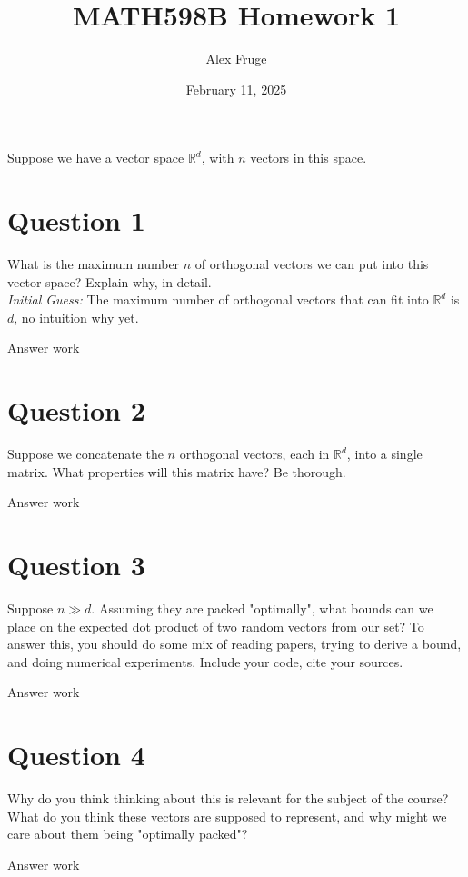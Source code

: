 \documentclass[hidelinks]{article}
\title{\textbf{MATH598B Homework 1}}
\author{Alex Fruge}
\date{February 11, 2025}
\begin{document}
	\hypersetup{bookmarksnumbered=true,}
	\pagecolor{black}
	\color{white}
	\maketitle

	
	\begin{Large}
			Suppose we have a vector space $\mathbb{R}^d$, with $n$ vectors in this space. 
	\end{Large}
	
	\section{Question 1}

	What is the maximum number $n$ of orthogonal vectors we can put into this vector space? Explain why, in detail.\\
	
		\textit{Initial Guess:} The maximum number of orthogonal vectors that can fit into $\mathbb{R}^d$ is $d$, no intuition why yet.
	
	{\color{SkyBlue}
		Answer work
		
	}
	
	\section{Question 2}
	
	Suppose we concatenate the $n$ orthogonal vectors, each in $\mathbb{R}^d$, into a single matrix. What properties will this matrix have? Be thorough.
	
	{\color{SkyBlue}
		Answer work
		
	}
	
	\section{Question 3}
	
	Suppose $n\gg d$. Assuming they are packed "optimally", what bounds can we place on the expected dot product of two random vectors from our set? To answer this, you should do some mix of reading papers, trying to derive a bound, and doing numerical experiments. Include your code, cite your sources.
	
	{\color{SkyBlue}
		Answer work
		
	}
	
	\section{Question 4}
	Why do you think thinking about this is relevant for the subject of the course? What do you think these vectors are supposed to represent, and why might we care about them being "optimally packed"?
	
	{\color{SkyBlue}
		Answer work
		
	}
	
\end{document}
